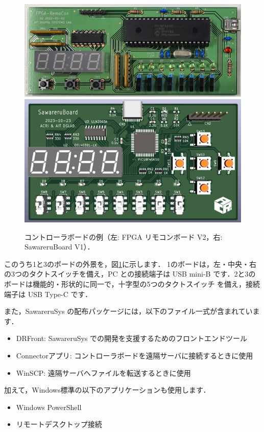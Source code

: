 \begin{figure}[ht]
 \centering
 \includegraphics[width=80truemm]{figs/remocon_v2.jpg}
 \includegraphics[width=60truemm]{figs/sawareru_v4.jpg}
 \caption{コントローラボードの例（左: FPGA リモコンボード V2，右: SawareruBoard V1）．}
 \label{fig:boards}
\end{figure}

このうち1と3のボードの外景を，図\ref{fig:boards}に示します．
1のボードは，左・中央・右の3つのタクトスイッチを備え，PC との接続端子は USB
mini-B です．2と3のボードは機能的・形状的に同一で，十字型の5つのタクトスイッチ
を備え，接続端子は USB Type-C です．

また，SawareruSys の配布パッケージには，以下のファイル一式が含まれています．
\begin{itemize}
 \item DRFront: SawareruSys での開発を支援するためのフロントエンドツール
 \item Connectorアプリ: コントローラボードを遠隔サーバに接続するときに使用
 \item WinSCP: 遠隔サーバへファイルを転送するときに使用
\end{itemize}
加えて，Windows標準の以下のアプリケーションも使用します．
\begin{itemize}
 \item Windows PowerShell
 \item リモートデスクトップ接続
\end{itemize}

